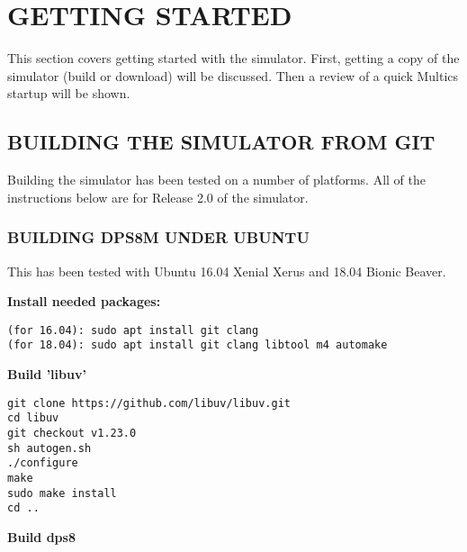 \section[Getting Started]{GETTING STARTED}

This section covers getting started with the simulator. First, getting a copy of the simulator (build or download) will be discussed.
Then a review of a quick Multics startup will be shown.

\subsection[Building the Simulator from Git]{BUILDING THE SIMULATOR FROM GIT}

Building the simulator has been tested on a number of platforms. All of the instructions below are for Release 2.0 of the simulator.

\subsubsection[Building dps8m under Ubuntu]{BUILDING DPS8M UNDER UBUNTU}

This has been tested with Ubuntu 16.04 Xenial Xerus and 18.04 Bionic Beaver.

\textbf{Install needed packages:}

\begin{adjustwidth}{5ex}{1ex}
	\texttt{(for 16.04):    sudo apt install git clang} \\
    \texttt{(for 18.04):    sudo apt install git clang libtool m4 automake}
\end{adjustwidth}  

\textbf{Build 'libuv'}

\begin{adjustwidth}{5ex}{1ex}
    \texttt{git clone https://github.com/libuv/libuv.git} \\
    \texttt{cd libuv} \\
    \texttt{git checkout v1.23.0} \\
    \texttt{sh autogen.sh} \\
    \texttt{./configure} \\
    \texttt{make} \\
    \texttt{sudo make install} \\
    \texttt{cd ..} \\
\end{adjustwidth}  

\textbf{Build dps8}

